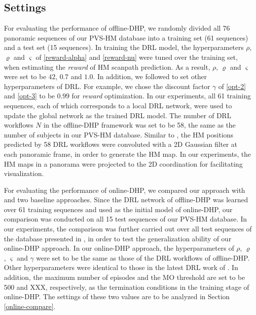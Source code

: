 \documentclass[10pt,journal,compsoc]{IEEEtran}
\begin{document}
\subsection{Settings}\label{sec:settings}
For evaluating the performance of offline-DHP, we randomly divided all 76 panoramic sequences of our PVS-HM database into a training set (61 sequences) and a test set (15 sequences). In training the DRL model, the hyperparameters $\rho$, $\varrho$ and $\varsigma$ of \eqref{reward-alpha} and \eqref{reward-nu} were tuned over the training set,  when estimating the \textit{reward} of HM scanpath prediction. As a result, $\rho$, $\varrho$ and $\varsigma$ were set to be $42$, $0.7$ and $1.0$. In addition, we followed \cite{mnih2016asynchronous} to set other hyperparameters of DRL. For example, we chose the discount factor $\gamma$ of \eqref{opt-2} and \eqref{opt-3} to be $0.99$ for \textit{reward} optimization. In our experiments, all 61 training sequences, each of which corresponds to a local DRL network, were used to update the global network as the trained DRL model.
The number of DRL workflows $N$ in the offline-DHP framework was set to be 58, the same as the number of subjects in our PVS-HM database.
Similar to \cite{matin1974saccadic},  the HM positions predicted by 58 DRL workflows were convoluted with a 2D Gaussian filter at each panoramic frame, in order to generate the HM map.
In our experiments, the HM maps in a panorama were projected to the 2D coordination for facilitating visualization.

For evaluating the performance of online-DHP, we compared our approach with \cite{hu2017deep} and two baseline approaches. Since the DRL network of offline-DHP was learned over 61 training sequences and used as the initial model of online-DHP, our comparison was conducted on all 15 test sequences of our PVS-HM database. In our experiments, the comparison was further carried out over all test sequences of the database presented in \cite{hu2017deep}, in order to test the generalization ability of our online-DHP approach.
In our online-DHP approach, the hyperparameters of $\rho$, $\varrho$, $\varsigma$ and $\gamma$ were set to be the same as those of the DRL workflows of offline-DHP.
Other hyperparameters were identical to those in the latest DRL work of \cite{mnih2016asynchronous}.
In addition, the maximum number of episodes and the MO threshold are set to be 500 and XXX, respectively, as the termination conditions in the training stage of online-DHP. The settings of these two values are to be analyzed in Section \ref{online-compare}.
\end{document}
